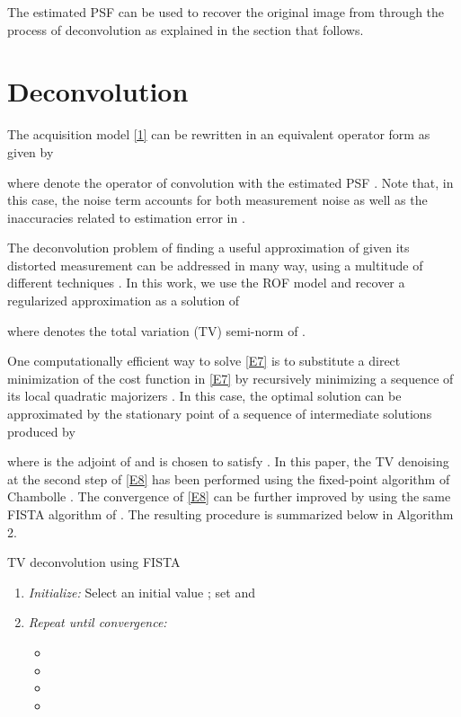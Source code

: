 \pdfoutput=1 \documentclass[journal]{IEEEtran}
\begin{document}
The estimated PSF can be used to recover the original image  from  through the process of deconvolution as explained in the section that follows.

\section{Deconvolution}
The acquisition model \eqref{1} can be rewritten in an equivalent operator form as given by

where  denote the operator of convolution with the estimated PSF . Note that, in this case, the noise term  accounts for both measurement noise as well as the inaccuracies related to estimation error in .

The deconvolution problem of finding a useful approximation of  given its distorted measurement  can be addressed in many way, using a multitude of different techniques \cite{31, 32, 33}. In this work, we use the ROF model and recover a regularized approximation as a solution of

where  denotes the total variation (TV) semi-norm of .

One computationally efficient way to solve \eqref{E7} is to substitute a direct minimization of the cost function in \eqref{E7} by recursively minimizing a sequence of its local quadratic majorizers \cite{33}. In this case, the optimal solution  can be approximated by the stationary point of a sequence of intermediate solutions produced by

where  is the adjoint of  and  is chosen to satisfy . In this paper, the TV denoising at the second step of \eqref{E8} has been performed using the fixed-point algorithm of Chambolle \cite{11}. The convergence of \eqref{E8} can be further improved by using the same FISTA algorithm of \cite{33}. The resulting procedure is summarized below in Algorithm 2.

\begin{algorithm}
\setlength{\leftmargini}{0pt}
\caption{TV deconvolution using FISTA}
\begin{enumerate}
\item {\it Initialize:} Select an initial value ; set  and \\
\item {\it Repeat until convergence:}
\begin{itemize}
\item 
\item 
\item 
\item 
\end{itemize}
\end{enumerate}
\label{algo2}
\end{algorithm}
\end{document}
